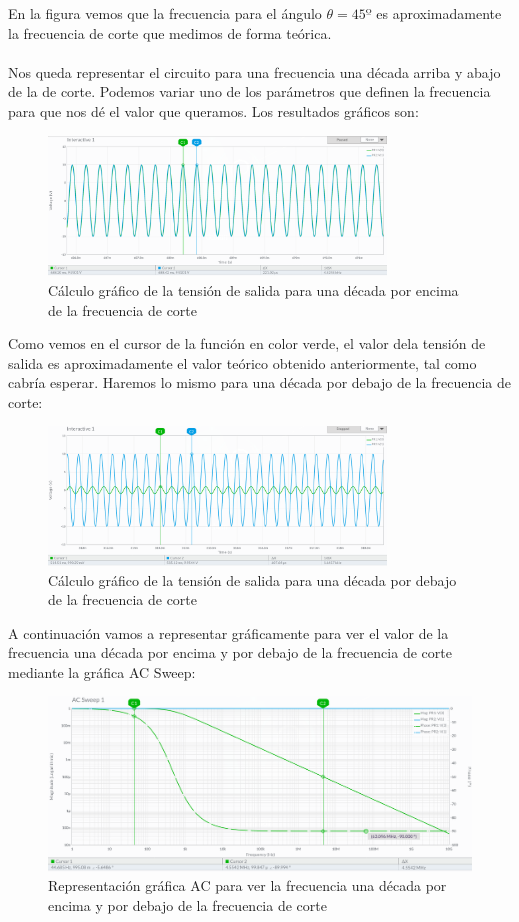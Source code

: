 \documentclass[11pt,letterpaper]{article}
\begin{document}
En la figura vemos que la frecuencia para el ángulo $\theta=45º$ es aproximadamente la frecuencia de corte que medimos de forma teórica.\\
\\
Nos queda representar el circuito para una frecuencia una década arriba y abajo de la de corte. Podemos variar uno de los parámetros que definen la frecuencia para que nos dé el valor que queramos. Los resultados gráficos son:
\begin{figure}[H]
	\centering
	\includegraphics[width=0.8\textwidth]{imagen/decadaarriba.png}
	\caption{Cálculo gráfico de la tensión de salida para una década por encima de la frecuencia de corte}
	\label{fig:imagen-decadaarriba-png}
\end{figure}
Como vemos en el cursor de la función en color verde, el valor dela tensión de salida es aproximadamente el valor teórico obtenido anteriormente, tal como cabría esperar. Haremos lo mismo para una década por debajo de la frecuencia de corte:
\begin{figure}[H]
	\centering
	\includegraphics[width=0.8\textwidth]{imagen/decadaabajo.png}
	\caption{Cálculo gráfico de la tensión de salida para una década por debajo de la frecuencia de corte}
	\label{fig:}
\end{figure}
A continuación vamos a representar gráficamente para ver el valor de la frecuencia una década por encima y por debajo de la frecuencia de corte mediante la gráfica AC Sweep:
\begin{figure}[H]
	\centering
	\includegraphics[width=1\textwidth]{imagen/accorte.png}
	\caption{Representación gráfica AC para ver la frecuencia una década por encima y por debajo de la frecuencia de corte}
	\label{fig:imagen-accorte-png}
\end{figure}
\end{document}
